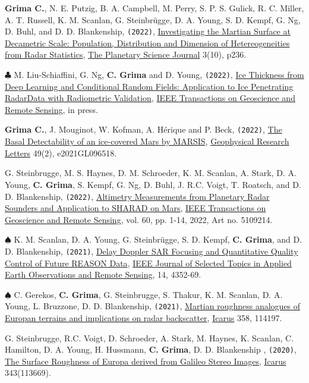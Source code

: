 \begin{etaremune}
\item
  \textbf{Grima C.}, N. E. Putzig, B. A. Campbell, M. Perry, S. P. S. Gulick, R. C. Miller, A. T. Russell, K. M. Scanlan, G. Steinbrügge, D. A. Young, S. D. Kempf, G. Ng, D. Buhl, and D. D. Blankenship, \texttt{(2022)}, \href{https://doi.org/10.3847/PSJ/ac9277}{Investigating the Martian Surface at Decametric Scale: Population, Distribution and Dimension of Hetereogeneities from Radar Statistics}, \ul{The Planetary Science Journal} 3(10), p236.
\item
  $\clubsuit$ M. Liu-Schiaffini, G. Ng, \textbf{C. Grima} and D. Young, \texttt{(2022)}, \href{https://ieeexplore.ieee.org/document/9916288}{Ice Thickness from Deep Learning and Conditional Random Fields: Application to Ice Penetrating RadarData with Radiometric Validation}, \ul{IEEE Transactions on Geoscience and Remote Sensing}, in press.
\item
  \textbf{Grima C.}, J. Mouginot, W. Kofman, A. Hérique and P. Beck, \texttt{(2022)}, \href{https://doi.org/10.1029/2021GL096518}{The Basal Detectability of an ice-covered Mars by MARSIS}, \ul{Geophysical Research Letters} 49(2), e2021GL096518.
\item
  G. Steinbrugge, M. S. Haynes, D. M. Schroeder, K. M. Scanlan, A. Stark, D. A. Young, \textbf{C. Grima}, S. Kempf, G. Ng, D. Buhl, J. R.C. Voigt, T. Roatsch, and D. D. Blankenship, \texttt{(2022)}, \href{https://doi.org/10.1109/TGRS.2021.3134638}{Altimetry Measurements from Planetary Radar Sounders and Application to SHARAD on Mars}, \ul{IEEE Transactions on Geoscience and Remote Sensing}, vol. 60, pp. 1-14, 2022, Art no. 5109214.
\item
  $\spadesuit$ K. M. Scanlan, D. A. Young, G. Steinbrügge, S. D. Kempf, \textbf{C. Grima}, and D. D. Blankenship, \texttt{(2021)}, \href{https://ieeexplore.ieee.org/document/9399772?source=authoralert}{Delay Doppler SAR Focusing and Quantitative Quality Control of Future REASON Data}, \ul{IEEE Journal of Selected Topics in Applied Earth Observations and Remote Sensing}, 14, 4352-69.
\item
  $\spadesuit$ C. Gerekos, \textbf{C. Grima}, G. Steinbrugge, S. Thakur, K. M. Scanlan, D. A. Young, L. Bruzzone, D. D. Blankenship, \texttt{(2021)}, \href{https://doi.org/10.1016/j.icarus.2020.114197}{Martian roughness analogues of Europan terrains and implications on radar backscatter}, \ul{Icarus} 358, 114197.
\item
  G. Steinbrugge, R.C. Voigt, D. Schroeder, A. Stark, M. Haynes, K. Scanlan, C. Hamilton, D. A. Young, H. Hussmann, \textbf{C. Grima}, D. D. Blankenship , \texttt{(2020)}, \href{https://www.sciencedirect.com/science/article/abs/pii/S0019103519301526}{The Surface Roughness of Europa derived from Galileo Stereo Images}, \ul{Icarus} 343(113669).

\end{etaremune}
